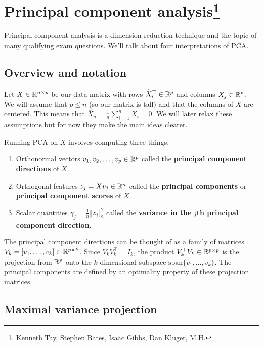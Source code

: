 \section{Principal component analysis\footnote{Kenneth Tay, Stephen Bates, Isaac Gibbs, Dan Kluger, M.H.}}\label{sec pca}

Principal component analysis is a dimension reduction technique and the topic of many qualifying exam questions. We'll talk about four interpretations of PCA.

\subsection{Overview and notation}


Let $X \in \mathbb{R}^{n \times p}$ be our data matrix with rows $\widetilde{X}_i^\top  \in \mathbb{R}^p$ and columns $X_j \in \mathbb{R}^n$. We will assume that $p \le n$ (so our matrix is tall) and that the columns of $X$ are centered. This means that $\bar{X}_n = \frac{1}{n}\sum_{i=1}^n\widetilde{X}_i = 0$. We will later relax these assumptions but for now they make the main ideas clearer.

Running PCA on $X$ involves computing three things:
\begin{enumerate}
    \item Orthonormal vectors $v_1,v_2,\ldots,v_p \in \mathbb{R}^p$ called the \textbf{principal component directions} of $X$.
    \item Orthogonal features $z_j = Xv_j \in \mathbb{R}^n$ called the \textbf{principal components} or \textbf{principal component scores} of $X$.
    \item Scalar quantities $\gamma_j = \frac{1}{n}\Vert z_j \Vert^2_2$ called the \textbf{variance in the} $j$\textbf{th principal component direction}. 
\end{enumerate}
The principal component directions can be thought of as a family of matrices $V_k = [v_1,\ldots,v_k] \in \mathbb{R}^{p \times k}$. Since $V_k V_k^\top = I_k$, the product $V_k^\top V_k  \in \mathbb{R}^{p \times p}$ is the projection from $\mathbb{R}^p$ onto the $k$-dimensional subspace $\text{span}\{v_1,\ldots,v_k\}$. The principal components are defined by an optimality property of these projection matrices. 

\subsection{Maximal variance projection}

